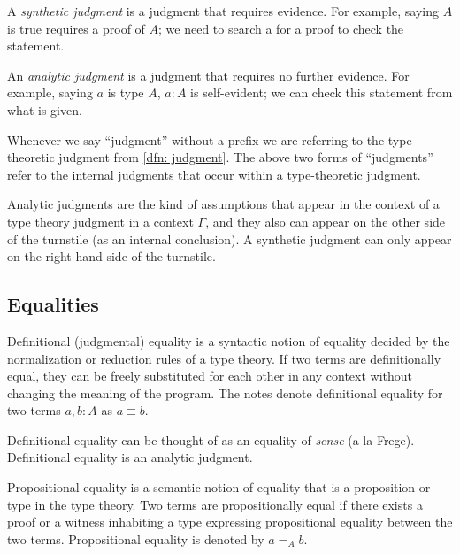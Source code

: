 \documentclass{article}
\begin{document}
\begin{definition}[Harper]
  A \emph{synthetic judgment} is a judgment that requires evidence. For example, saying $A$ is true requires a proof of $A$; we need to search a for a proof to check the statement.
\end{definition}

\begin{definition}[Harper]
  An \emph{analytic judgment} is a judgment that requires no further evidence. For example, saying $a$ is type $A$, $a : A$ is self-evident; we can check this statement from what is given.
\end{definition}
\begin{remark}
  Whenever we say ``judgment'' without a prefix we are referring to the type-theoretic judgment from \cref{dfn: judgment}. The above two forms of ``judgments'' refer to the internal judgments that occur within a type-theoretic judgment.
\end{remark}

\begin{remark}
  Analytic judgments are the kind of assumptions that appear in the context of a type theory judgment in a context $\Gamma$, and they also can appear on the other side of the turnstile (as an internal conclusion). A synthetic judgment can only appear on the right hand side of the turnstile.
\end{remark}

\subsection{Equalities}

\begin{definition}
  Definitional (judgmental) equality is a syntactic notion of equality decided by the normalization or reduction rules of a type theory. If two terms are definitionally equal, they can be freely substituted for each other in any context without changing the meaning of the program. The notes denote definitional equality for two terms $a, b : A$ as $a \equiv b$.
\end{definition}

\begin{remark}[?]
  Definitional equality can be thought of as an equality of \emph{sense} (a la Frege). Definitional equality is an analytic judgment.
\end{remark}

\begin{definition}
  Propositional equality is a semantic notion of equality that is a proposition or type in the type theory. Two terms are propositionally equal if there exists a proof or a witness inhabiting a type expressing propositional equality between the two terms. Propositional equality is denoted by $a =_{A} b$.
\end{definition}
\end{document}
